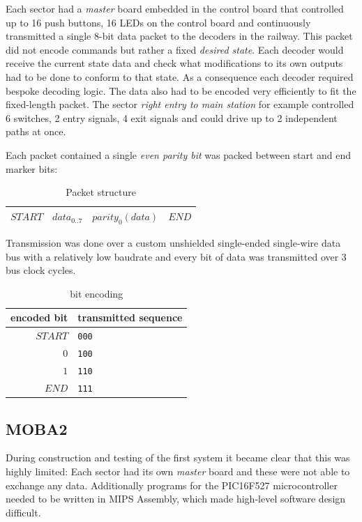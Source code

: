 \documentclass{scrreprt}
\begin{document}
Each sector had a \emph{master} board embedded in the control board that controlled up to 16 push buttons, 16 LEDs on the control board and continuously transmitted a single 8-bit data packet to the decoders in the railway.
This packet did not encode commands but rather a fixed \emph{desired state}.
Each decoder would receive the current state data and check what modifications to its own outputs had to be done to conform to that state.
As a consequence each decoder required bespoke decoding logic.
The data also had to be encoded very efficiently to fit the fixed-length packet.
The sector \emph{right entry to main station} for example controlled 6 switches, 2 entry signals, 4 exit signals and could drive up to 2 independent paths at once.

Each packet contained a single \emph{even parity bit} was packed between start and end marker bits:

\begin{table}[ht!]
\centering
\begin{tabular}{ | c | c | c | c | }
\hline
$START$ & $data_{0..7}$ & $parity_0(data)$ & $END$ \\\hline
\end{tabular}
\caption{Packet structure}
\end{table}


Transmission was done over a custom unshielded single-ended single-wire data bus with a relatively low baudrate and every bit of data was transmitted over 3 bus clock cycles.

\begin{table}[ht!]
\centering
\begin{tabular}{ | r | l | }
\hline
encoded bit & transmitted sequence \\\hline\hline
$START$ & \texttt{000} \\\hline
$0$     & \texttt{100} \\\hline
$1$     & \texttt{110} \\\hline
$END$   & \texttt{111} \\\hline
\end{tabular}
\caption{bit encoding}
\end{table}

\subsection{MOBA2}
During construction and testing of the first system it became clear that this was highly limited:
Each sector had its own \emph{master} board and these were not able to exchange any data.
Additionally programs for the PIC16F527 microcontroller needed to be written in MIPS Assembly, which made high-level software design difficult.
\end{document}
